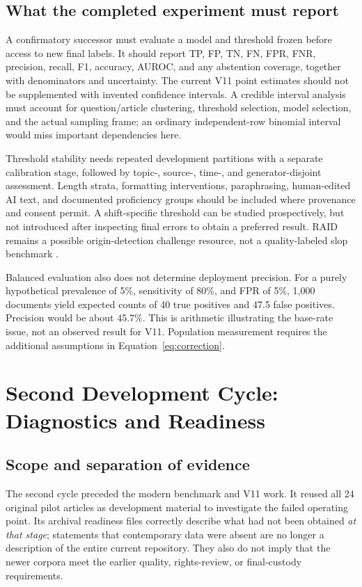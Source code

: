 \documentclass[11pt]{article}
\begin{document}
\subsection{What the completed experiment must report}
A confirmatory successor must evaluate a model and threshold frozen before
access to new final labels. It should report TP, FP, TN, FN, FPR, FNR,
precision, recall, F1, accuracy, AUROC, and any abstention coverage, together
with denominators and uncertainty. The current V11 point estimates should
not be supplemented with invented confidence intervals. A credible interval
analysis must account for question/article clustering, threshold selection,
model selection, and the actual sampling frame; an ordinary independent-row
binomial interval would miss important dependencies here.

Threshold stability needs repeated development partitions with a separate
calibration stage, followed by topic-, source-, time-, and generator-disjoint
assessment. Length strata, formatting interventions, paraphrasing, human-edited
AI text, and documented proficiency groups should be included where provenance
and consent permit. A shift-specific threshold can be studied prospectively,
but not introduced after inspecting final errors to obtain a preferred result.
RAID remains a possible origin-detection challenge resource, not a
quality-labeled slop benchmark \cite{raid}.

Balanced evaluation also does not determine deployment precision. For a
purely hypothetical prevalence of 5\%, sensitivity of 80\%, and FPR of 5\%,
1,000 documents yield expected counts of 40 true positives and 47.5 false
positives. Precision would be about 45.7\%. This is arithmetic illustrating
the base-rate issue, not an observed result for V11. Population measurement
requires the additional assumptions in Equation~\ref{eq:correction}.

\section{Second Development Cycle: Diagnostics and Readiness}
\subsection{Scope and separation of evidence}
The second cycle preceded the modern benchmark and V11 work. It reused all
24 original pilot articles as development material to investigate the failed
operating point. Its archival readiness files correctly describe what had
not been obtained \emph{at that stage}; statements that contemporary data
were absent are no longer a description of the entire current repository.
They also do not imply that the newer corpora meet the earlier quality,
rights-review, or final-custody requirements.
\end{document}
